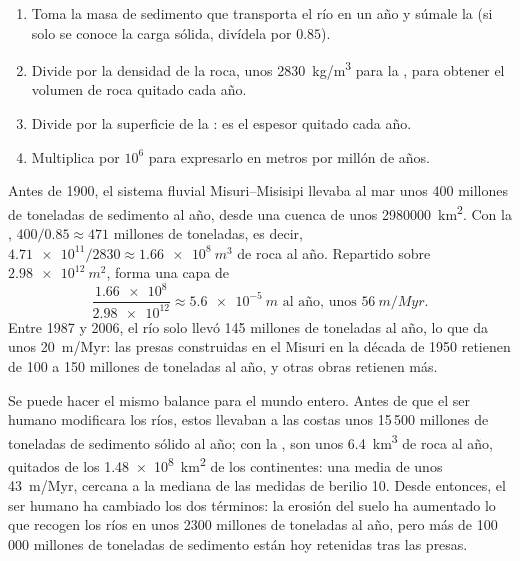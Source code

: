 \begin{method}\label{met:g12:destruction-of-mountains:budget}
\begin{enumerate}
  \item Toma la masa de sedimento que transporta el río en un año y súmale la
         (si solo se conoce la carga sólida, divídela por
        $0.85$).
  \item Divide por la densidad de la roca, unos \qty{2830}{kg/m^3} para la
        , para obtener el volumen de roca quitado cada año.
  \item Divide por la superficie de la : es el espesor
        quitado cada año.
  \item Multiplica por $10^6$ para expresarlo en metros por millón de años.
\end{enumerate}
\end{method}

\begin{example}[El Misisipi]\label{ex:g12:destruction-of-mountains:mississippi}
Antes de 1900, el sistema fluvial Misuri--Misisipi llevaba al mar unos 400
millones de toneladas de sedimento al año, desde una cuenca de unos
\qty{2980000}{km^2}. Con la , $400/0.85 \approx 471$ millones de
toneladas, es decir, $\num{4.71e11}/2830 \approx \qty{1.66e8}{m^3}$ de roca al
año. Repartido sobre $\qty{2.98e12}{m^2}$, forma una capa de
\[
  \frac{\num{1.66e8}}{\num{2.98e12}} \approx \qty{5.6e-5}{m}
  \text{ al año, unos } \qty{56}{m/Myr}.
\]
Entre 1987 y 2006, el río solo llevó 145 millones de toneladas al año, lo que
da unos \qty{20}{m/Myr}: las presas construidas en el Misuri en la década de
1950 retienen de 100 a 150 millones de toneladas al año, y otras obras
retienen más.
\end{example}

Se puede hacer el mismo balance para el mundo entero. Antes de que el ser
humano modificara los ríos, estos llevaban a las costas unos 15\,500 millones
de toneladas de sedimento sólido al año; con la , son unos
\qty{6.4}{km^3} de roca al año, quitados de los \qty{1.48e8}{km^2} de los
continentes: una  media de unos \qty{43}{m/Myr}, cercana a
la mediana de las medidas de berilio 10. Desde entonces, el ser humano ha
cambiado los dos términos: la erosión del suelo ha aumentado lo que recogen
los ríos en unos 2300 millones de toneladas al año, pero más de 100\,000
millones de toneladas de sedimento están hoy retenidas tras las presas.

